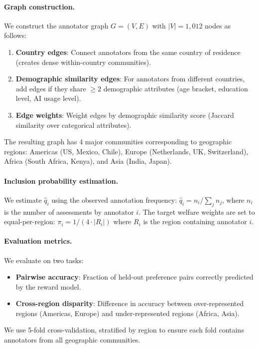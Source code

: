 \documentclass{article}
\theoremstyle{plain}
\theoremstyle{definition}
\theoremstyle{remark}
\begin{document}
\paragraph{Graph construction.}
We construct the annotator graph $G = (V, E)$ with $|V| = 1{,}012$ nodes as follows:
\begin{enumerate}
    \item \textbf{Country edges}: Connect annotators from the same country of residence (creates dense within-country communities).
    \item \textbf{Demographic similarity edges}: For annotators from different countries, add edges if they share $\geq 2$ demographic attributes (age bracket, education level, AI usage level).
    \item \textbf{Edge weights}: Weight edges by demographic similarity score (Jaccard similarity over categorical attributes).
\end{enumerate}
The resulting graph has 4 major communities corresponding to geographic regions: Americas (US, Mexico, Chile), Europe (Netherlands, UK, Switzerland), Africa (South Africa, Kenya), and Asia (India, Japan).

\paragraph{Inclusion probability estimation.}
We estimate $\hat{q}_i$ using the observed annotation frequency: $\hat{q}_i = n_i / \sum_j n_j$, where $n_i$ is the number of assessments by annotator $i$. The target welfare weights are set to equal-per-region: $\pi_i = 1 / (4 \cdot |R_i|)$ where $R_i$ is the region containing annotator $i$.

\paragraph{Evaluation metrics.}
We evaluate on two tasks:
\begin{itemize}
    \item \textbf{Pairwise accuracy}: Fraction of held-out preference pairs correctly predicted by the reward model.
    \item \textbf{Cross-region disparity}: Difference in accuracy between over-represented regions (Americas, Europe) and under-represented regions (Africa, Asia).
\end{itemize}
We use 5-fold cross-validation, stratified by region to ensure each fold contains annotators from all geographic communities.
\end{document}
